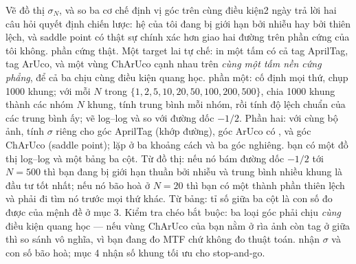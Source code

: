 \documentclass[../../marker.tex]{subfiles}
\begin{document}
\begin{duan}{Vẽ đồ thị \(\sigma_N\), và so ba cơ chế định vị góc trên cùng điều kiện}{2 ngày}
\dmt trả lời hai câu hỏi quyết định chiến lược: hệ của tôi đang bị giới hạn bởi nhiễu hay bởi thiên lệch, và saddle point có thật sự chính xác hơn giao hai đường trên phần cứng của tôi không.
\ddl phần cứng thật. Một target lai tự chế: in một tấm có cả tag AprilTag, tag ArUco, và một vùng ChArUco cạnh nhau trên \emph{cùng một tấm nền cứng phẳng}, để cả ba chịu cùng điều kiện quang học.
\dbc phần một: cố định mọi thứ, chụp 1000 khung; với mỗi \(N\) trong \(\{1,2,5,10,20,50,100,200,500\}\), chia 1000 khung thành các nhóm \(N\) khung, tính trung bình mỗi nhóm, rồi tính độ lệch chuẩn của các trung bình ấy; vẽ log--log và so với đường dốc \(-1/2\). Phần hai: với cùng bộ ảnh, tính \(\sigma\) riêng cho góc AprilTag (khớp đường), góc ArUco có , và góc ChArUco (saddle point); lặp ở ba khoảng cách và ba góc nghiêng.
\dxk bạn có một đồ thị log--log và một bảng ba cột. Từ đồ thị: nếu nó bám đường dốc \(-1/2\) tới \(N=500\) thì bạn đang bị giới hạn thuần bởi nhiễu và trung bình nhiều khung là đầu tư tốt nhất; nếu nó bão hoà ở \(N=20\) thì bạn có một thành phần thiên lệch và phải đi tìm nó trước mọi thứ khác. Từ bảng: tỉ số giữa ba cột là con số đo được của mệnh đề ở mục 3. Kiểm tra chéo bắt buộc: ba loại góc phải chịu \emph{cùng} điều kiện quang học --- nếu vùng ChArUco của bạn nằm ở rìa ảnh còn tag ở giữa thì so sánh vô nghĩa, vì bạn đang đo MTF chứ không đo thuật toán.
\dnv {} nhận \(\sigma\) và con số bão hoà;  mục 4 nhận số khung tối ưu cho stop-and-go.
\end{duan}
\end{document}
